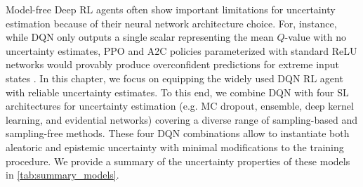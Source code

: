 Model-free Deep RL agents often show important limitations for uncertainty estimation because of their neural network architecture choice. For, instance, while DQN only outputs a single scalar representing the mean $Q$-value with no uncertainty estimates, PPO and A2C policies parameterized with standard ReLU networks would provably produce overconfident predictions for extreme input states \citep{overconfident-relu}. In this chapter, we focus on equipping the widely used DQN RL agent with reliable uncertainty estimates. To this end, we combine DQN with four SL architectures for uncertainty estimation (e.g. MC dropout, ensemble, deep kernel learning, and evidential networks) covering a diverse range of sampling-based and sampling-free methods. These four DQN combinations allow to instantiate both aleatoric and epistemic uncertainty with minimal modifications to the training procedure.  We provide a summary of the uncertainty properties of these models in \cref{tab:summary_models}.

\begin{table*}[ht!]
    \vspace{-0mm}
	\caption{Summary of the uncertainty properties of the models.}
	\label{tab:summary_models}
	\vspace{-0mm}
	\centering
	\vspace{-0mm}
\end{table*}

